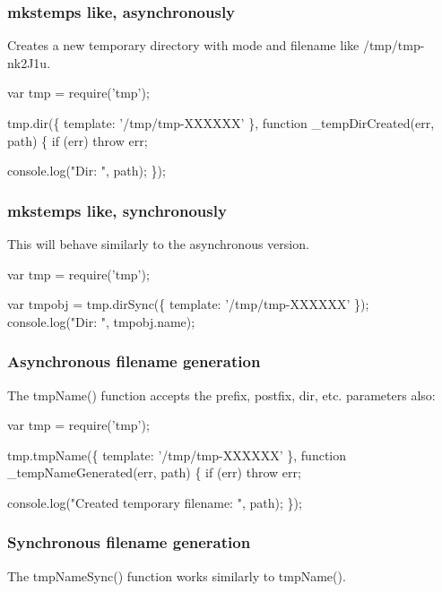 \subsubsection*{mkstemps like, asynchronously}

Creates a new temporary directory with mode {} and filename like {\ttfamily /tmp/tmp-\/nk2\+J1u}.


\begin{DoxyCode}
var tmp = require('tmp');

tmp.dir(\{ template: '/tmp/tmp-XXXXXX' \}, function \_tempDirCreated(err, path) \{
  if (err) throw err;

  console.log("Dir: ", path);
\});
\end{DoxyCode}


\subsubsection*{mkstemps like, synchronously}

This will behave similarly to the asynchronous version.


\begin{DoxyCode}
var tmp = require('tmp');

var tmpobj = tmp.dirSync(\{ template: '/tmp/tmp-XXXXXX' \});
console.log("Dir: ", tmpobj.name);
\end{DoxyCode}


\subsubsection*{Asynchronous filename generation}

The {\ttfamily tmp\+Name()} function accepts the {\ttfamily prefix}, {\ttfamily postfix}, {\ttfamily dir}, etc. parameters also\+:


\begin{DoxyCode}
var tmp = require('tmp');

tmp.tmpName(\{ template: '/tmp/tmp-XXXXXX' \}, function \_tempNameGenerated(err, path) \{
    if (err) throw err;

    console.log("Created temporary filename: ", path);
\});
\end{DoxyCode}


\subsubsection*{Synchronous filename generation}

The {\ttfamily tmp\+Name\+Sync()} function works similarly to {\ttfamily tmp\+Name()}.



